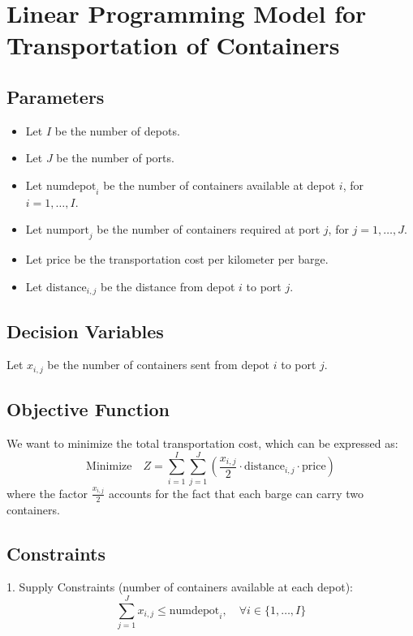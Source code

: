 \documentclass{article}
\begin{document}
\section*{Linear Programming Model for Transportation of Containers}

\subsection*{Parameters}
\begin{itemize}
    \item Let \( I \) be the number of depots.
    \item Let \( J \) be the number of ports.
    \item Let \( \text{numdepot}_i \) be the number of containers available at depot \( i \), for \( i = 1, \ldots, I \).
    \item Let \( \text{numport}_j \) be the number of containers required at port \( j \), for \( j = 1, \ldots, J \).
    \item Let \( \text{price} \) be the transportation cost per kilometer per barge.
    \item Let \( \text{distance}_{i,j} \) be the distance from depot \( i \) to port \( j \).
\end{itemize}

\subsection*{Decision Variables}
Let \( x_{i,j} \) be the number of containers sent from depot \( i \) to port \( j \).

\subsection*{Objective Function}
We want to minimize the total transportation cost, which can be expressed as:
\[
\text{Minimize} \quad Z = \sum_{i=1}^{I} \sum_{j=1}^{J} \left( \frac{x_{i,j}}{2} \cdot \text{distance}_{i,j} \cdot \text{price} \right)
\]
where the factor \( \frac{x_{i,j}}{2} \) accounts for the fact that each barge can carry two containers.

\subsection*{Constraints}
1. Supply Constraints (number of containers available at each depot):
\[
\sum_{j=1}^{J} x_{i,j} \leq \text{numdepot}_i, \quad \forall i \in \{1, \ldots, I\}
\]
\end{document}
